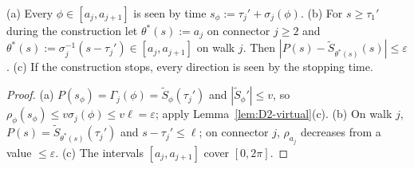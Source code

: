 \begin{lemma}\label{lem:D2-see}
(a) Every $\phi\in[a_j,a_{j+1}]$ is seen by time $s_\phi:=\tau_j'+\sigma_j(\phi)$.
(b) For $s\ge\tau_1'$ during the construction let $\theta^*(s):=a_j$ on connector $j\ge2$ and
$\theta^*(s):=\sigma_j^{-1}(s-\tau_j')\in[a_j,a_{j+1}]$ on walk $j$. Then $|P(s)-\tilde S_{\theta^*(s)}(s)|\le\varepsilon$.
(c) If the construction stops, every direction is seen by the stopping time.
\end{lemma}
\begin{proof}
(a) $P(s_\phi)=\Gamma_j(\phi)=\tilde S_\phi(\tau_j')$ and $|\tilde S_\phi'|\le v$, so $\rho_\phi(s_\phi)\le v\sigma_j(\phi)\le v\ell=\varepsilon$;
apply Lemma~\ref{lem:D2-virtual}(c). (b) On walk $j$, $P(s)=\tilde S_{\theta^*(s)}(\tau_j')$ and $s-\tau_j'\le\ell$; on connector $j$,
$\rho_{a_j}$ decreases from a value $\le\varepsilon$. (c) The intervals $[a_j,a_{j+1}]$ cover $[0,2\pi]$.
\end{proof}

